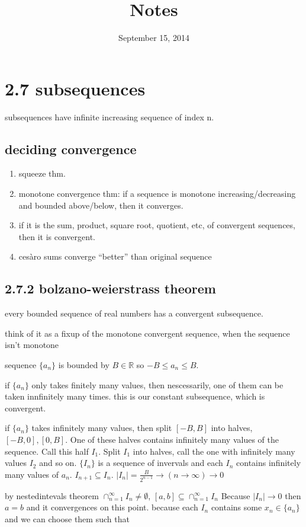 \documentclass[letterpaper]{article}
\begin{document}
\title{Notes}
\date{September 15, 2014}
\maketitle
\section*{2.7 subsequences}
subsequences have infinite increasing sequence of index n.

\subsection*{deciding convergence}
\begin{enumerate}
\item
squeeze thm.
\item
monotone convergence thm: if a sequence is monotone increasing/decreasing and bounded above/below, then it converges.
\item
if it is the sum, product, square root, quotient, etc, of convergent sequences, then it is convergent.
\item
cesàro sums converge ``better'' than original sequence
\end{enumerate}
\subsection*{2.7.2 bolzano-weierstrass theorem}
every  bounded sequence of real numbers has a convergent subsequence.

think of it as a fixup of the monotone convergent sequence, when the sequence isn't monotone

sequence $\{a_n\}$ is bounded by $B\in\mathbb{R}$ so $-B\le a_n\le B$.

if $\{a_n\}$ only takes finitely many values, then nescessarily, one of them can be taken innfinitely many times. this is our constant subsequence, which is convergent.

if $\{a_n\}$ takes infinitely many values, then split $[-B,B]$ into halves, $[-B,0],[0,B]$. One of these halves contains infinitely many values of the sequence.
Call this half $I_1$. Split $I_1$ into halves, call the one with infinitely many values $I_2$ and so on. $\{I_n\}$ is a sequence of invervals and each $I_n$ contains infinitely many values of $a_n$. $I_{n+1}\subseteq I_n$. $\left\lvert I_n\right\rvert=\frac{B}{2^{n-1}}{\rightarrow}({n\to\infty})\to 0$

by nestedintevals theorem $\cap_{n=1}^\infty I_n\ne\emptyset$, $[a,b]\subseteq\cap_{n=1}^\infty I_n$ Because $|I_n|\to0$ then $a=b$ and it convergences on this point. because each $I_n$ contains some $x_n\in\{a_n\}$ and we can choose them such that 
\end{document}
